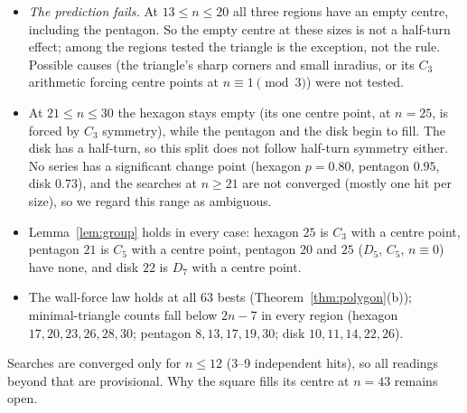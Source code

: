 \documentclass[11pt]{amsart}
\theoremstyle{definition}
\begin{document}
\begin{itemize}
\item \emph{The prediction fails.} At $13 \le n \le 20$ all three regions have an empty centre, including the pentagon. So the empty centre at these sizes is not a half-turn effect; among the regions tested the triangle is the exception, not the rule. Possible causes (the triangle's sharp corners and small inradius, or its $C_3$ arithmetic forcing centre points at $n \equiv 1 \pmod 3$) were not tested. %
\item At $21 \le n \le 30$ the hexagon stays empty (its one centre point, at $n = 25$, is forced by $C_3$ symmetry), while the pentagon and the disk begin to fill. The disk has a half-turn, so this split does not follow half-turn symmetry either. No series has a significant change point (hexagon $p = 0.80$, pentagon $0.95$, disk $0.73$), and the searches at $n \ge 21$ are not converged (mostly one hit per size), so we regard this range as ambiguous. %
\item Lemma~\ref{lem:group} holds in every case: hexagon $25$ is $C_3$ with a centre point, pentagon $21$ is $C_5$ with a centre point, pentagon $20$ and $25$ ($D_5$, $C_5$, $n \equiv 0$) have none, and disk $22$ is $D_7$ with a centre point. %
\item The wall-force law holds at all 63 bests (Theorem~\ref{thm:polygon}(b)); minimal-triangle counts fall below $2n-7$ in every region (hexagon $17, 20, 23, 26, 28, 30$; pentagon $8, 13, 17, 19, 30$; disk $10, 11, 14, 22, 26$). %
\end{itemize}
Searches are converged only for $n \le 12$ (3--9 independent hits), so all readings beyond that are provisional. Why the square fills its centre at $n = 43$ remains open. %

\end{document}
